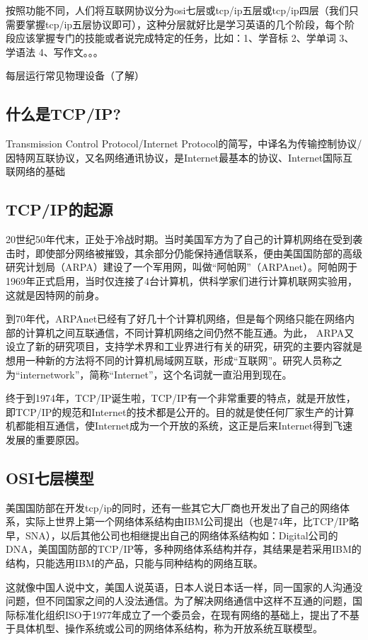 \documentclass[cn,chinese,color=cyan]{elegantbook}
\begin{document}
 按照功能不同，人们将互联网协议分为osi七层或tcp/ip五层或tcp/ip四层（我们只需要掌握tcp/ip五层协议即可），这种分层就好比是学习英语的几个阶段，每个阶段应该掌握专门的技能或者说完成特定的任务，比如：1、学音标 2、学单词 3、学语法 4、写作文。。。



每层运行常见物理设备（了解）

\subsection{什么是TCP/IP?}
Transmission Control Protocol/Internet Protocol的简写，中译名为传输控制协议/因特网互联协议，又名网络通讯协议，是Internet最基本的协议、Internet国际互联网络的基础

\subsection{TCP/IP的起源}
20世纪50年代末，正处于冷战时期。当时美国军方为了自己的计算机网络在受到袭击时，即使部分网络被摧毁，其余部分仍能保持通信联系，便由美国国防部的高级研究计划局（ARPA）建设了一个军用网，叫做“阿帕网”（ARPAnet）。阿帕网于1969年正式启用，当时仅连接了4台计算机，供科学家们进行计算机联网实验用，这就是因特网的前身。

到70年代，ARPAnet已经有了好几十个计算机网络，但是每个网络只能在网络内部的计算机之间互联通信，不同计算机网络之间仍然不能互通。为此， ARPA又设立了新的研究项目，支持学术界和工业界进行有关的研究，研究的主要内容就是想用一种新的方法将不同的计算机局域网互联，形成“互联网”。研究人员称之为“internetwork”，简称“Internet”，这个名词就一直沿用到现在。

终于到1974年，TCP/IP诞生啦，TCP/IP有一个非常重要的特点，就是开放性，即TCP/IP的规范和Internet的技术都是公开的。目的就是使任何厂家生产的计算机都能相互通信，使Internet成为一个开放的系统，这正是后来Internet得到飞速发展的重要原因。

\subsection{OSI七层模型}

美国国防部在开发tcp/ip的同时，还有一些其它大厂商也开发出了自己的网络体系，实际上世界上第一个网络体系结构由IBM公司提出（也是74年，比TCP/IP略早，SNA），以后其他公司也相继提出自己的网络体系结构如：Digital公司的DNA，美国国防部的TCP/IP等，多种网络体系结构并存，其结果是若采用IBM的结构，只能选用IBM的产品，只能与同种结构的网络互联。

这就像中国人说中文，美国人说英语，日本人说日本话一样，同一国家的人沟通没问题，但不同国家之间的人没法通信。为了解决网络通信中这样不互通的问题，国际标准化组织ISO于1977年成立了一个委员会，在现有网络的基础上，提出了不基于具体机型、操作系统或公司的网络体系结构，称为开放系统互联模型。
\end{document}
